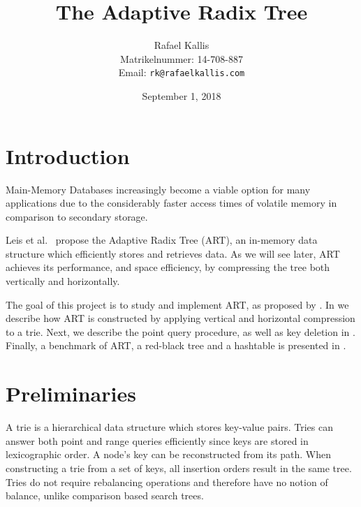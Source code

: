 \documentclass[abstracton,12pt]{scrartcl}
\title{The Adaptive Radix Tree}
\author{
    Rafael Kallis\\[-5pt]
    \scriptsize Matrikelnummer: 14-708-887\\[-5pt]
    \scriptsize Email: \texttt{rk@rafaelkallis.com}
}
\date{\vspace*{2cm}September 1, 2018}
\theoremstyle{definition}
\begin{document}
\maketitle





\newpage
\section{Introduction}

Main-Memory Databases increasingly become a viable option for many applications
due to the considerably faster access times of volatile memory 
in comparison to secondary storage.

Leis et al.\ \cite{leis2013adaptive} propose the Adaptive Radix Tree (ART), an in-memory
data structure which efficiently stores and retrieves data.
As we will see later, ART achieves its performance, and space
efficiency, by compressing the tree both vertically and horizontally.

The goal of this project is to study and implement ART, as proposed by 
\cite{leis2013adaptive}. 
In  we describe how ART is constructed by applying 
vertical and horizontal compression to a trie.
Next, we describe the point query procedure, as well as 
key deletion in .
Finally, a benchmark of ART, a red-black tree and a hashtable
is presented in .

\section{Preliminaries}
\label{sec:preliminaries}

A trie \cite{fredkin1960trie} is a hierarchical data structure which
stores key-value pairs. Tries can answer both point and range queries 
efficiently since keys are stored in lexicographic order.
A node's key can be reconstructed from its path. When constructing
a trie from a set of keys, all insertion orders result in the same tree.
Tries do not require rebalancing operations and therefore have no notion
of balance, unlike comparison based search trees.
\end{document}
